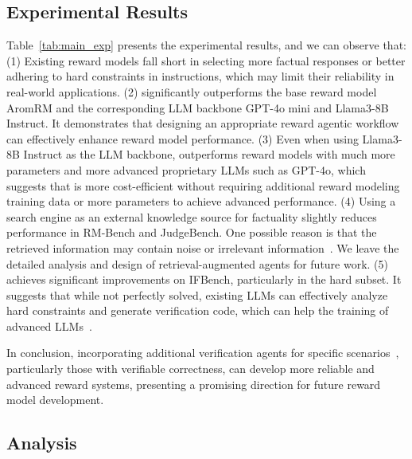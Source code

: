 \subsection{Experimental Results}
\label{sec:exp_result}



Table~\ref{tab:main_exp} presents the experimental results, and we can observe that:
(1) Existing reward models fall short in selecting more factual responses or better adhering to hard constraints in instructions, which may limit their reliability in real-world applications.
(2) \ourmethod significantly outperforms the base reward model AromRM and the corresponding LLM backbone GPT-4o mini and Llama3-8B Instruct. It demonstrates that designing an appropriate reward agentic workflow can effectively enhance reward model performance.
(3) Even when using Llama3-8B Instruct as the LLM backbone, \ourmethodllama outperforms reward models with much more parameters and more advanced proprietary LLMs such as GPT-4o, which suggests that \ourmethod is more cost-efficient without requiring additional reward modeling training data or more parameters to achieve advanced performance.
(4) Using a search engine as an external knowledge source for factuality slightly reduces performance in RM-Bench and JudgeBench. One possible reason is that the retrieved information may contain noise or irrelevant information~\citep{chen2024benchmarking}. We leave the detailed analysis and design of retrieval-augmented agents for future work.
(5) \ourmethod achieves significant improvements on IFBench, particularly in the hard subset. It suggests that while not perfectly solved, existing LLMs can effectively analyze hard constraints and generate verification code, which can help the training of advanced LLMs~\citep{lambert2024t}.

In conclusion, incorporating additional verification agents for specific scenarios~\cite{mu2024rule, lambert2024t}, particularly those with verifiable correctness, can develop more reliable and advanced reward systems, presenting a promising direction for future reward model development.



\subsection{Analysis}
\label{sec:exp_analysis}


